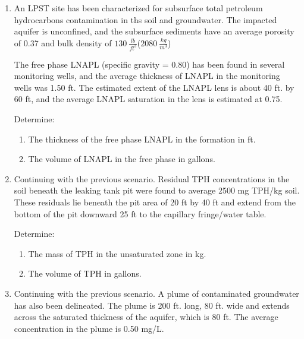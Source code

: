 \documentclass[12pt]{article}
\begin{document}
\begin{enumerate}

\clearpage
\item  An LPST site has been characterized for subsurface total petroleum hydrocarbons contamination in ths soil and groundwater. The impacted aquifer is unconfined, and the subsurface sediments have an average porosity of 0.37 and bulk density of $130~\frac{lb}{ft^3}$($2080~\frac{kg}{m^3}$)

The free phase LNAPL (specific gravity = 0.80) has been found in several monitoring wells, and the average thickness of LNAPL in the monitoring wells was 1.50 ft.  The estimated extent of the LNAPL lens is about 40 ft. by 60 ft, and the average LNAPL saturation in the lens is estimated at 0.75.

Determine:
\begin{enumerate}
\item The thickness of the free phase LNAPL in the formation in ft.
\item The volume of LNAPL in the free phase in gallons.
\end{enumerate}

\item Continuing with the previous scenario. Residual TPH concentrations in the soil beneath the leaking tank pit were found to average 2500 mg TPH/kg soil.  These residuals lie beneath the pit area of 20 ft by 40 ft and extend from the bottom of the pit downward 25 ft to the capillary fringe/water table.

Determine:
\begin{enumerate}
\item The mass of TPH in the unsaturated zone in kg.
\item The volume of TPH in gallons.
\end{enumerate}

\item Continuing with the previous scenario. A plume of contaminated groundwater has also been delineated.  The plume is 200 ft. long, 80 ft. wide and extends across the saturated thickness of the aquifer, which is 80 ft.  The average concentration in the plume is 0.50 mg/L.


\end{enumerate}
\end{document}

